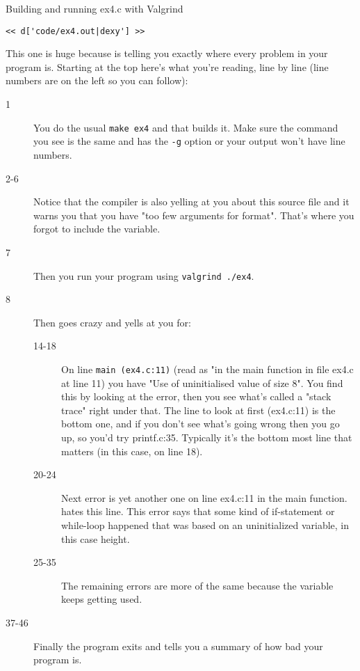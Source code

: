 \begin{Terminal}{Building and running ex4.c with Valgrind}
\begin{lstlisting}
<< d['code/ex4.out|dexy'] >>
\end{lstlisting}
\end{Terminal}

This one is huge because  is telling you exactly where
every problem in your program is.  Starting at the top here's what you're
reading, line by line (line numbers are on the left so you can follow):

\begin{description}
\item[1] You do the usual \verb|make ex4| and that builds it. Make sure the  command
    you see is the same and has the \verb|-g| option or your  output won't
    have line numbers.
\item[2-6] Notice that the compiler is also yelling at you about this source file and it
    warns you that you have "too few arguments for format".  That's where you 
    forgot to include the  variable.
\item[7] Then you run your program using \verb|valgrind ./ex4|.
\item[8] Then  goes crazy and yells at you for:
    \begin{description}
        \item[14-18] On line \verb|main (ex4.c:11)| (read as "in the main function in
            file ex4.c at line 11) you have "Use of uninitialised value of size 8".
            You find this by looking at the error, then you see what's called a "stack trace"
            right under that.  The line to look at first (ex4.c:11) is the bottom one, 
            and if you don't see what's going wrong then you go up, so you'd try
            printf.c:35.  Typically it's the bottom most line that matters (in this case, on line 18).
        \item[20-24] Next error is yet another one on line ex4.c:11 in the main function. 
            hates this line.  This error says that some kind of if-statement or while-loop
            happened that was based on an uninitialized variable, in this case height.
        \item[25-35] The remaining errors are more of the same because the variable keeps getting
        used.
    \end{description}
\item[37-46] Finally the program exits and  tells you a summary of how bad
    your program is.
\end{description}

